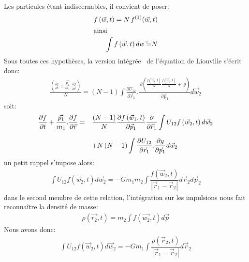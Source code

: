 Les particules étant indiscernables, il convient de poser:
\begin{align*}
	f\left(  \vec{w},t\right)  =N\,f^{(1)}(\vec{w},t) \\
	\intertext{ainsi}
	\int f\left(  \vec{w},t\right)  d\vec{w=}N
\end{align*}
Sous toutes ces hypothèses, la version intégrée~ de l'équation de Liouville s'écrit donc:
\begin{align*}
	\frac{\left(  \frac{\partial f}{\partial t}+\frac{\vec{p_{1}}}{m_{1}}.\frac{\partial f}{\partial\vec{r}}\right)  }{{N}}=\left(  {N-1}%
	\right)  \displaystyle\int\tfrac{\partial U_{12}}{\partial\vec{r}_{1}}.\frac{{\ \partial}\left(  \frac{f\left(  \vec{w}_{1},t\right)  }{N}%
	\frac{f\left(  \vec{w}_{2},t\right)  }{N}+{\ g}\right)  }{{\ \partial}\vec{p}_{1}}d\vec{w}_{2}%
\end{align*}
soit:
\begin{align*}%
	\begin{array}[c]{ll}%
		\dfrac{\partial f}{\partial t}+\dfrac{\vec{p_{1}}}{m_{1}}.\dfrac{\partial f}{\partial\vec{r}}= & \dfrac{\left(  N-1\right)  }{N}\dfrac{\partial
		f\left(  \vec{w}_{1},t\right)  }{\partial\vec{p}_{1}}\dfrac{\partial}{\partial\vec{r}_{1}}\displaystyle\int U_{12}f\left(  \vec{w}%
		_{2},t\right)  d\vec{w}_{2}\\
		& \\
		& +N\left(  N-1\right)  \displaystyle\int\dfrac{\partial U_{12}}{\partial\vec{r}_{1}}.\dfrac{\partial g}{\partial\vec{p}_{1}}%
		d\vec{w}_{2}%
	\end{array}
\end{align*}
un petit rappel s'impose alors:
\begin{align*}
	\displaystyle\int U_{12}f\left(  \vec{w}_{2},t\right)  d\vec{w}_{2}=-Gm_{1}m_{2}\displaystyle\int\dfrac{f\left(  \vec{w}_{2},t\right)
	}{\left\vert \vec{r}_{1}-\vec{r}_{2}\right\vert }d\vec{r}_{2}d\vec{p}_{2}%
\end{align*}
dans le second membre de cette relation, l'intégration sur les impulsions nous fait reconnaître la densité de masse:
\begin{align*}
	\rho\left(  \vec{r_{2}},t\right)  =m_{2}\displaystyle\int f\left(\vec{w_{2}},t\right)  d\vec{p}%
\end{align*}
Nous avons donc:
\begin{align*}
	\displaystyle\int U_{12}f\left(  \vec{w}_{2},t\right)  d\vec{w}_{2}=-Gm_{1}\displaystyle\int\dfrac{\rho\left(  \vec{r}_{2},t\right)
	}{\left\vert \vec{r}_{1}-\vec{r}_{2}\right\vert }d\vec{r}_{2}%
\end{align*}
